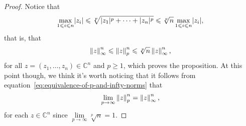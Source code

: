 \begin{proof}
  Notice that
  \[
    \max\limits_{1\leqslant{i}\leqslant{n}}\lvert{z_{i}}\rvert
    \leqslant\sqrt[p]{\lvert{z_{1}}\rvert^{p}+\cdots+\lvert{z_{n}}\rvert^{p}}
    \leqslant\sqrt[p]{n}\max\limits_{1\leqslant{i}\leqslant{n}}\lvert{z_{i}}\rvert,
  \]
  that is, that
  \begin{equation}\label{eq:equivalence-of-p-and-infty-norms}
    \left\lVert{z}\right\rVert^{n}_{\infty}
    \leqslant
    \left\lVert{z}\right\rVert^{n}_{p}
    \leqslant
    \sqrt[p]{n}\left\lVert{z}\right\rVert^{n}_{\infty},
  \end{equation}
  for all \(z=(z_{1},\ldots,z_{n})\in\mathbb{C}^{n}\) and \(p\geqslant{1}\),
  which proves the proposition. At this point though, we think it's worth
  noticing that it follows from
  equation~\eqref{eq:equivalence-of-p-and-infty-norms} that
  \[
    \lim\limits_{p\to\infty}\left\lVert{z}\right\rVert^{n}_{p}=\left\lVert{z}\right\rVert^{n}_{\infty},
  \]
  for each \(z\in\mathbb{C}^{n}\) since
  \(\lim\limits_{p\to\infty}\sqrt[p]{n}=1\).
\end{proof}
